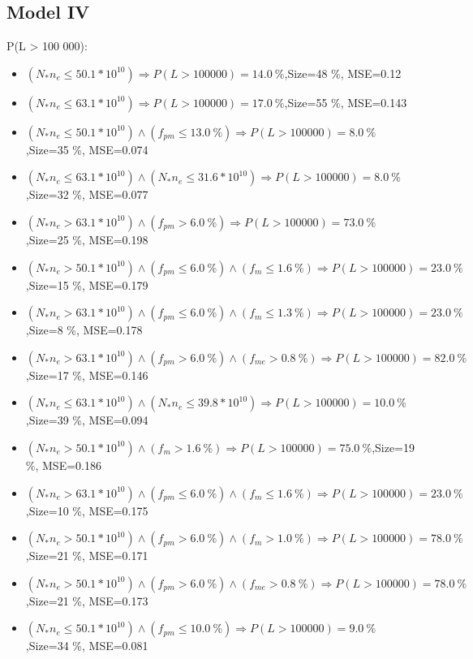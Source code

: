 \documentclass[numbered]{CSL}
\begin{document}
\subsection{Model IV}
P(L > 100 000):
\begin{itemize}
\item $(N_* n_e \leq 50.1 * 10^{10}) \Rightarrow P(L > 100 000) = 14.0~\%$,\hfill Size=48 \%, MSE=0.12
\item $(N_* n_e \leq 63.1 * 10^{10}) \Rightarrow P(L > 100 000) = 17.0~\%$,\hfill Size=55 \%, MSE=0.143
\item $(N_* n_e \leq 50.1 * 10^{10}) \land (f_{pm} \leq 13.0~\%) \Rightarrow P(L > 100 000) = 8.0~\%$,\hfill Size=35 \%, MSE=0.074
\item $(N_* n_e \leq 63.1 * 10^{10}) \land (N_* n_e \leq 31.6 * 10^{10}) \Rightarrow P(L > 100 000) = 8.0~\%$,\hfill Size=32 \%, MSE=0.077
\item $(N_* n_e > 63.1 * 10^{10}) \land (f_{pm} > 6.0~\%) \Rightarrow P(L > 100 000) = 73.0~\%$,\hfill Size=25 \%, MSE=0.198
\item $(N_* n_e > 50.1 * 10^{10}) \land (f_{pm} \leq 6.0~\%) \land (f_m \leq 1.6~\%) \Rightarrow P(L > 100 000) = 23.0~\%$,\hfill Size=15 \%, MSE=0.179
\item $(N_* n_e > 63.1 * 10^{10}) \land (f_{pm} \leq 6.0~\%) \land (f_m \leq 1.3~\%) \Rightarrow P(L > 100 000) = 23.0~\%$,\hfill Size=8 \%, MSE=0.178
\item $(N_* n_e > 63.1 * 10^{10}) \land (f_{pm} > 6.0~\%) \land (f_{me} > 0.8~\%) \Rightarrow P(L > 100 000) = 82.0~\%$,\hfill Size=17 \%, MSE=0.146
\item $(N_* n_e \leq 63.1 * 10^{10}) \land (N_* n_e \leq 39.8 * 10^{10}) \Rightarrow P(L > 100 000) = 10.0~\%$,\hfill Size=39 \%, MSE=0.094
\item $(N_* n_e > 50.1 * 10^{10}) \land (f_m > 1.6~\%) \Rightarrow P(L > 100 000) = 75.0~\%$,\hfill Size=19 \%, MSE=0.186
\item $(N_* n_e > 63.1 * 10^{10}) \land (f_{pm} \leq 6.0~\%) \land (f_m \leq 1.6~\%) \Rightarrow P(L > 100 000) = 23.0~\%$,\hfill Size=10 \%, MSE=0.175
\item $(N_* n_e > 50.1 * 10^{10}) \land (f_{pm} > 6.0~\%) \land (f_m > 1.0~\%) \Rightarrow P(L > 100 000) = 78.0~\%$,\hfill Size=21 \%, MSE=0.171
\item $(N_* n_e > 50.1 * 10^{10}) \land (f_{pm} > 6.0~\%) \land (f_{me} > 0.8~\%) \Rightarrow P(L > 100 000) = 78.0~\%$,\hfill Size=21 \%, MSE=0.173
\item $(N_* n_e \leq 50.1 * 10^{10}) \land (f_{pm} \leq 10.0~\%) \Rightarrow P(L > 100 000) = 9.0~\%$,\hfill Size=34 \%, MSE=0.081

\end{itemize}
\end{document}
